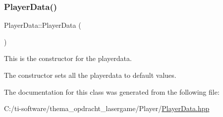\subsubsection{\texorpdfstring{Player\+Data()}{PlayerData()}}
{\footnotesize\ttfamily Player\+Data\+::\+Player\+Data (\begin{DoxyParamCaption}{ }\end{DoxyParamCaption})\hspace{0.3cm}{\ttfamily [inline]}}



This is the constructor for the playerdata. 

The constructor sets all the playerdata to default values. 

The documentation for this class was generated from the following file\+:\begin{DoxyCompactItemize}
\item 
C\+:/ti-\/software/thema\+\_\+opdracht\+\_\+lasergame/\+Player/\mbox{\hyperlink{_player_data_8hpp}{Player\+Data.\+hpp}}\end{DoxyCompactItemize}
